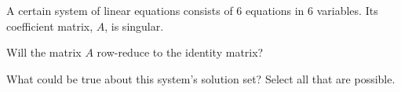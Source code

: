 \documentclass{ximera}
\author{Rob Beezer}
\begin{document}
\begin{exercise}
  A certain system of linear equations consists of 6 equations in 6
  variables.  Its coefficient matrix, $A$, is singular.

  Will the matrix $A$ row-reduce to the identity matrix?

  \begin{multipleChoice}
  \end{multipleChoice}

  What could be true about this system's solution set?  Select all that
  are possible.
  \begin{selectAll}
  \end{selectAll}
\end{exercise}
\end{document}
